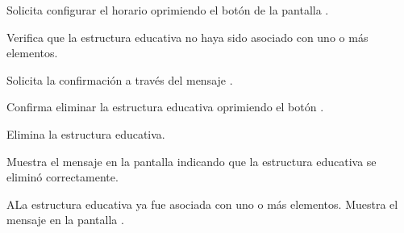\begin{UCtrayectoria}
	\UCpaso [\UCactor] Solicita configurar el horario oprimiendo el botón  de la pantalla .
	
	\UCpaso [\UCsist] Verifica que la estructura educativa no haya sido asociado con uno o más elementos. 
	
	\UCpaso [\UCsist] Solicita la confirmación a través del mensaje .
	
	\UCpaso [\UCactor] Confirma eliminar la estructura educativa oprimiendo el botón .
	
	\UCpaso [\UCsist] Elimina la estructura educativa.
	
	\UCpaso [\UCsist] Muestra el mensaje  en la pantalla  indicando que la estructura educativa se eliminó correctamente.	
	
\end{UCtrayectoria}

\begin{UCtrayectoriaA}{A}{La estructura educativa ya fue asociada con uno o más elementos.}
	\UCpaso [\UCsist] Muestra el mensaje  en la pantalla . 
\end{UCtrayectoriaA}
